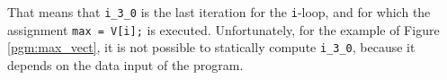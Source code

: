 That means that \verb|i_3_0| is the last iteration for the \verb|i|-loop, and for which the assignment \verb|max = V[i];| is executed. Unfortunately, for the example of  Figure~ \ref{pgm:max_vect}, it is not possible to  statically compute \verb|i_3_0|, because it depends on the data input of the program.



